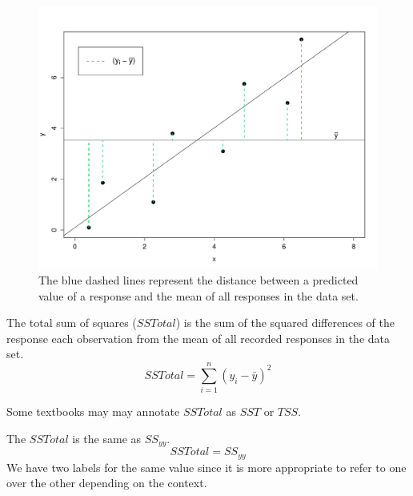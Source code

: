 \begin{figure}[H]
	\begin{center}
	\includegraphics[width=12cm]{Section8/plotSSTotal.pdf}
	\end{center}
	\vspace{-0.75cm}
	\label{figureSSR}
	\caption{The blue dashed lines represent the distance between 
		a predicted value of a response and the 
		mean of all responses in the data set. }
\end{figure}

\begin{definition}
The total sum of squares ($SSTotal$) 
is the sum of the squared differences of the response each observation 
from the mean of all recorded responses in the data set.
	\begin{equation}
	\label{equationSSTotal}
	SSTotal = \sum_{i=1}^{n} ( y_{i} - \bar{y} )^{2}
	\end{equation}
\end{definition}

\begin{nt}
Some textbooks may may annotate $SSTotal$ as $SST$ or $TSS$. 
\end{nt}


\begin{nt}
\label{noteSStotalSSyy}
The $SSTotal$ is the same as $SS_{yy}$.
	\begin{equation}
	SSTotal = SS_{yy}
	\end{equation}
We have two labels for the same value since it is more appropriate
to refer to one over the other depending on the context.
\end{nt}
\hfill

